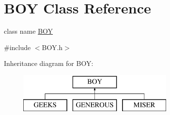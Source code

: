 \hypertarget{classBOY}{}\section{B\+OY Class Reference}
\label{classBOY}


class name \hyperlink{classBOY}{B\+OY}  




{\ttfamily \#include $<$B\+O\+Y.\+h$>$}

Inheritance diagram for B\+OY\+:\begin{figure}[H]
\begin{center}
\leavevmode
\includegraphics[height=2.000000cm]{classBOY}
\end{center}
\end{figure}
